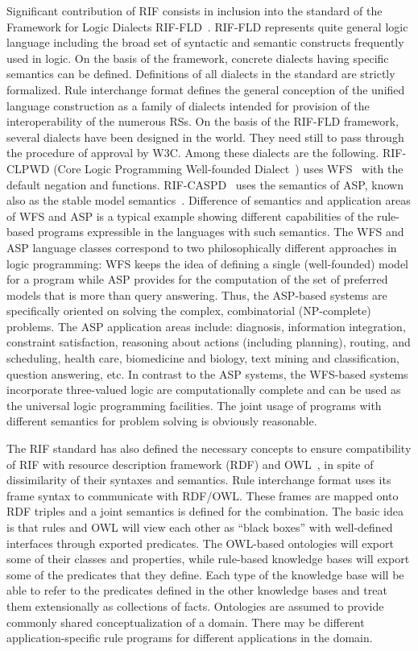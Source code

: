 \begin{multicols}{2}
  Significant contribution of RIF consists in inclusion into the standard of the
Framework for Logic Dialects RIF-FLD~\cite{19-kal}. RIF-FLD represents quite
general logic language including the broad set of syntactic and semantic constructs
frequently used in logic. On the basis of the framework, concrete dialects having
specific semantics can be defined. Definitions of all dialects in the standard are
strictly formalized. Rule interchange format defines the general conception of the unified language
construction as a family of dialects intended for provision of the interoperability of
the numerous RSs. On the basis of the RIF-FLD framework, several
dialects have been designed in the world. They need still to pass through the
procedure of approval by W3C. Among these dialects are the following. RIF-CLPWD
(Core Logic Programming Well-founded Dialect~\cite{23-kal}) uses WFS~\cite{25-kal}
with the default negation and functions.
  RIF-CASPD~\cite{22-kal}
uses the semantics of ASP, known also as the stable model
semantics~\cite{26-kal}. Difference of semantics and application areas of WFS and
ASP is a typical example showing different capabilities of the rule-based programs
expressible in the languages with such semantics. The WFS and ASP language classes
correspond to two philosophically different approaches in logic programming: WFS
keeps the idea of defining a single (well-founded) model for a program while ASP provides
for the computation of the set of preferred models that is more than query answering.
Thus, the ASP-based systems are specifically oriented on solving the complex,
combinatorial (NP-complete) problems. The ASP application areas include: diagnosis,
information integration, constraint satisfaction, reasoning about actions (including
planning), routing, and scheduling, health care, biomedicine and biology, text mining
and classification, question answering, etc. In contrast to the ASP systems, the
WFS-based systems incorporate three-valued logic are computationally complete and
can be used as the universal logic programming facilities. The joint usage of programs
with different semantics for problem solving is obviously reasonable.

The   RIF standard has also defined the necessary concepts to ensure compatibility of
RIF with resource description framework (RDF)
and OWL~\cite{27-kal}, in spite of dissimilarity of their syntaxes and
semantics. Rule interchange format uses its frame syntax to communicate with RDF/OWL. These frames
are mapped onto RDF triples and a joint semantics is defined for the combination.
The basic idea is that rules and OWL will view each other as ``black boxes'' with
well-defined interfaces through exported predicates. The OWL-based ontologies will
export some of their classes and properties, while rule-based knowledge bases will
export some of the predicates that they define. Each type of the knowledge base will
be able to refer to the predicates defined in the other knowledge bases and treat them
extensionally as collections of facts. Ontologies are assumed to provide commonly
shared conceptualization of a domain. There may be different application-specific rule
programs for different applications in the domain.


\end{multicols}
